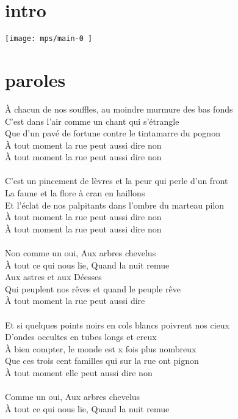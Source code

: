 \documentclass[11pt]{article}
\begin{document}
\section*{intro}
      \texttt{[image:  mps/main-0 ]}

\newpage

\section*{paroles}
À chacun de nos souffles, au moindre murmure des bas fonds \\
C'est dans l'air comme un chant qui s'étrangle \\
Que d'un pavé de fortune contre le tintamarre du pognon \\
À tout moment la rue peut aussi dire non \\
À tout moment la rue peut aussi dire non \\
\\
C'est un pincement de lèvres et la peur qui perle d'un front \\
La faune et la flore à cran en haillons \\
Et l'éclat de nos palpitants dans l'ombre du marteau pilon \\
À tout moment la rue peut aussi dire non \\
À tout moment la rue peut aussi dire non \\
\\
Non comme un oui, Aux arbres chevelus \\
À tout ce qui nous lie, Quand la nuit remue \\
Aux astres et aux Déesses \\
Qui peuplent nos rêves et quand le peuple rêve \\
À tout moment la rue peut aussi dire \\
\\
Et si quelques points noirs en cols blancs poivrent nos cieux \\
D'ondes occultes en tubes longs et creux \\
À bien compter, le monde est x fois plus nombreux \\
Que ces trois cent familles qui sur la rue ont pignon \\
À tout moment elle peut aussi dire non \\
\\
Comme un oui, Aux arbres chevelus \\
À tout ce qui nous lie, Quand la nuit remue \\
\end{document}
